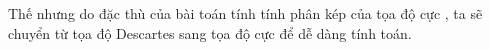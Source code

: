 \documentclass[preview]{standalone}
\begin{document}
\begin{center}
Thế nhưng do đặc thù của bài toán tính tính phân kép của tọa độ cực , ta sẽ chuyển từ tọa độ Descartes sang tọa độ cực để dễ dàng tính toán.
\end{center}
\end{document}
